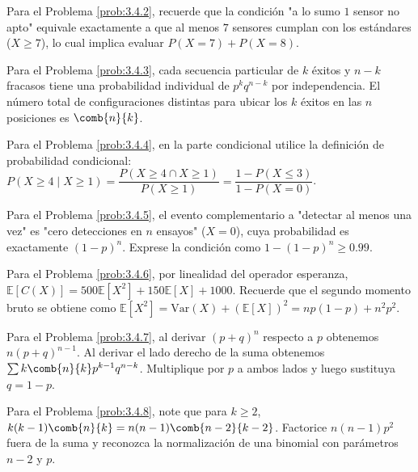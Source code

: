 \begin{sugerencia}
	\label{sug:3.4.2}
	Para el Problema \ref{prob:3.4.2}, recuerde que la condición "a lo sumo $1$ sensor no apto" equivale exactamente a que al menos $7$ sensores cumplan con los estándares ($X \ge 7$), lo cual implica evaluar $P(X=7) + P(X=8)$.
\end{sugerencia}

\begin{sugerencia}
	\label{sug:3.4.3}
	Para el Problema \ref{prob:3.4.3}, cada secuencia particular de $k$ éxitos y $n-k$ fracasos tiene una probabilidad individual de $p^k q^{n-k}$ por independencia. El número total de configuraciones distintas para ubicar los $k$ éxitos en las $n$ posiciones es $\comb{n}{k}$.
\end{sugerencia}

\begin{sugerencia}
	\label{sug:3.4.4}
	Para el Problema \ref{prob:3.4.4}, en la parte condicional utilice la definición de probabilidad condicional: $P(X \ge 4 \mid X \ge 1) = \dfrac{P(X \ge 4 \cap X \ge 1)}{P(X \ge 1)} = \dfrac{1 - P(X \le 3)}{1 - P(X = 0)}$.
\end{sugerencia}

\begin{sugerencia}
	\label{sug:3.4.5}
	Para el Problema \ref{prob:3.4.5}, el evento complementario a "detectar al menos una vez" es "cero detecciones en $n$ ensayos" ($X=0$), cuya probabilidad es exactamente $(1-p)^n$. Exprese la condición como $1 - (1-p)^n \ge 0.99$.
\end{sugerencia}

\begin{sugerencia}
	\label{sug:3.4.6}
	Para el Problema \ref{prob:3.4.6}, por linealidad del operador esperanza, $\mathbb{E}[C(X)] = 500 \mathbb{E}[X^2] + 150 \mathbb{E}[X] + 1000$. Recuerde que el segundo momento bruto se obtiene como $\mathbb{E}[X^2] = \text{Var}(X) + (\mathbb{E}[X])^2 = np(1-p) + n^2 p^2$.
\end{sugerencia}

\begin{sugerencia}
	\label{sug:3.4.7}
	Para el Problema \ref{prob:3.4.7}, al derivar $(p+q)^n$ respecto a $p$ obtenemos $n(p+q)^{n-1}$. Al derivar el lado derecho de la suma obtenemos $\sum k \comb{n}{k} p^{k-1} q^{n-k}$. Multiplique por $p$ a ambos lados y luego sustituya $q = 1-p$.
\end{sugerencia}

\begin{sugerencia}
	\label{sug:3.4.8}
	Para el Problema \ref{prob:3.4.8}, note que para $k \ge 2$, $k(k-1)\comb{n}{k} = n(n-1)\comb{n-2}{k-2}$. Factorice $n(n-1)p^2$ fuera de la suma y reconozca la normalización de una binomial con parámetros $n-2$ y $p$.
\end{sugerencia}

